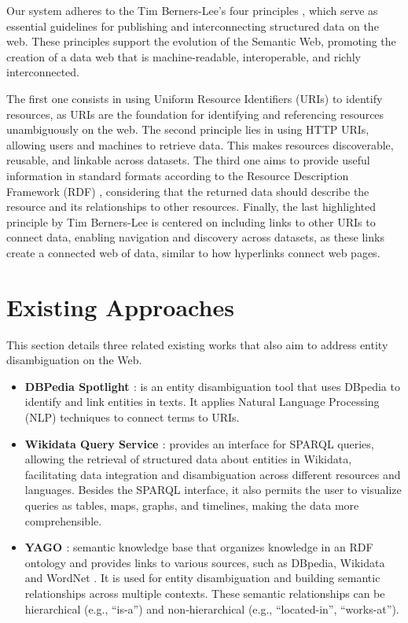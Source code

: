 \documentclass[twocolumn,twoside,11pt,a4paper]{article}
\begin{document}
Our system adheres to the Tim Berners-Lee’s four principles \cite{kn:tbl}, which serve as essential guidelines for publishing and interconnecting structured data on the web. These principles support the evolution of the Semantic Web, promoting the creation of a data web that is machine-readable, interoperable, and richly interconnected. 

The first one consists in using Uniform Resource Identifiers (URIs) to identify resources, as URIs are the foundation for identifying and referencing resources unambiguously on the web. The second principle lies in using HTTP URIs, allowing users and machines to retrieve data.
This makes resources discoverable, reusable, and linkable across datasets. The third one aims to provide useful information in standard formats according to the Resource Description Framework (RDF) \cite{rdf}, considering that the returned data should describe the resource and its relationships to other resources. Finally, the last highlighted principle by Tim Berners-Lee is centered on including links to other URIs to connect data, enabling navigation and discovery across datasets, as these links create a connected web of data, similar to how hyperlinks connect web pages.

\section{Existing Approaches}\label{sec:sota}

This section details three related existing works that also aim to address entity disambiguation on the Web.

\begin{itemize}

    \item \textbf{DBPedia Spotlight \cite{kn:DBS}}: is an entity disambiguation tool that uses DBpedia to identify and link entities in texts. It applies Natural Language Processing (NLP) techniques to connect terms to URIs.

    \item \textbf{Wikidata Query Service \cite{kn:WQS}}: provides an interface for SPARQL \cite{sparql} queries, allowing the retrieval of structured data about entities in Wikidata, facilitating data integration and disambiguation across different resources and languages. Besides the SPARQL interface, it also permits the user to visualize queries as tables, maps, graphs, and timelines, making the data more comprehensible.

    \item \textbf{YAGO \cite{kn:YAGO}}: semantic knowledge base that organizes knowledge in an RDF ontology and provides links to various sources, such as DBpedia, Wikidata and WordNet \cite{wordnet}. It is used for entity disambiguation and building semantic relationships across multiple contexts. These semantic relationships can be hierarchical (e.g., ``is-a'') and non-hierarchical (e.g., ``located-in'', ``works-at'').
    
\end{itemize}
\end{document}
